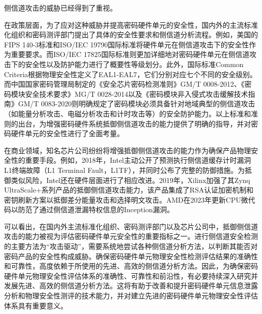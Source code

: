 {	侧信道攻击的威胁已经得到了重视。
	
	在政策层面，为了应对这种威胁并提高密码硬件单元的安全性，国内外的主流标准化组织和密码测评部门提出了具体的安全性要求和侧信道分析流程。例如，美国的FIPS 140-3标准\citep{FIPS140-3}和ISO/IEC 19790\citep{ISO/IEC19790}国际标准将硬件单元在侧信道攻击下的安全性作为重要要求。而ISO/IEC 17825\citep{ISO/IEC17825}国际标准则更加详细地对密码硬件单元在侧信道攻击下的安全性以及防护能力进行了概要性等级划分。此外，国际标准Common Criteria\citep{CCMB-2017-04-001}根据物理安全性定义了EAL1-EAL7，它们分别对应七个不同的安全级别。而中国国家密码管理局制定的《安全芯片密码检测准则》GM/T 0008-2012\citep{GM/T0008}、《密码模块安全技术要求》MG/T 0028-2014\citep{GM/T0028}以及《密码模块非入侵式攻击缓解技术指南》GM/T 0083-2020\citep{GM/T0083}则明确规定了密码模块必须具备针对地域典型的侧信道攻击（如能量分析攻击、电磁分析攻击和计时攻击等）的安全防护能力。以上标准和准则的出台，为增强密码硬件系统抵御侧信道攻击的能力提供了明确的指导，并对密码硬件单元的安全性进行了全面考量。
	
	在商业领域，知名芯片公司纷纷将增强抵御侧信道攻击的能力作为确保产品物理安全性的重要手段。例如，2018年，Intel主动公开了预测执行侧信道缓存计时漏洞L1终端故障（L1 Terminal Fault，L1TF），并同时公布了完整的防御措施\citep{L1TF}。为抵御类似风险，Intel还在硬件层面进行了相应改进\citep{AffectedProcessors}。2019年，Xilinx加强了其Zynq UltraScale+系列产品的抵御侧信道攻击能力，该产品集成了RSA认证加密机制和密钥刷新方案以抵御差分能量攻击和选择明文攻击\citep{UG1085}。AMD在2023年更新CPU微代码以防范了通过侧信道泄漏特权信息的Inception漏洞\citep{AMD-SB-7005}。
	
	可以看出，在国内外主流标准化组织、密码测评部门以及芯片公司中，抵御侧信道攻击的能力被视为评估密码硬件单元安全性的重要指标之一。进行侧信道安全检测的主要方法为“攻击驱动”，需要系统地尝试各种侧信道分析方法，以判断其能否对密码产品的安全性构成威胁\citep{ISO/IEC15408, GB/T18336}。确保密码硬件单元物理安全性检测评估结果的准确性和可靠性，高度依赖于所使用的先进、高效的侧信道分析方法。因此，为确保密码硬件单元物理安全性评估体系的准确性、可靠性和前沿性，有必要持续深入研究并发展先进、高效的侧信道分析方法。这将有助于改善和提升密码硬件单元信息泄露分析和物理安全性测评的技术能力，并对建立先进的密码硬件单元物理安全性评估体系具有重要意义。
	
}
